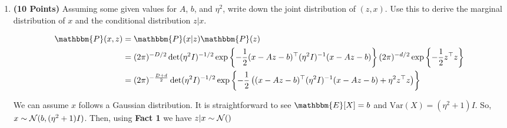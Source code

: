 \begin{enumerate}
\item \textbf{(10 Points)}
Assuming some given values for $A$, $b$, and $\eta^2$, write down the joint distribution of $(z,x)$. Use this to derive the marginal
distribution of $x$ and the conditional distribution $z|x$. 

\begin{soln}
  $$
  \begin{aligned}
    \mathbbm{P}(x, z) & = \mathbbm{P}(x \vert z) \mathbbm{P}(z) \\
    & = (2 \pi)^{-D/2} \det(\eta^2 I)^{-1/2} \exp\left\{-\frac{1}{2} (x - Az -  b)^\top (\eta^2 I)^{-1} (x - Az -b) \right\} (2 \pi)^{-d/2} \exp\left\{ -\frac{1}{2} z^\top z\right\} \\
    & = (2 \pi)^{-\frac{D + d}{2}} \det(\eta^2 I)^{-1/2} \exp\left\{-\frac{1}{2} \left((x - Az -  b)^\top (\eta^2 I)^{-1} (x - Az -b) + \eta^2 z^\top z\right) \right\}
  \end{aligned}
  $$

  We can assume $x$ follows a Gaussian distribution. 
  It is straightforward to see $\mathbbm{E}[X] = b$ and $\text{Var}(X) = (\eta^2 + 1)I$.
  So, $x \sim \mathcal{N}(b, (\eta^2 + 1)I)$.
  Then, using \textbf{Fact 1} we have $z \vert x \sim \mathcal{N}()$

\end{soln}


\end{enumerate}
